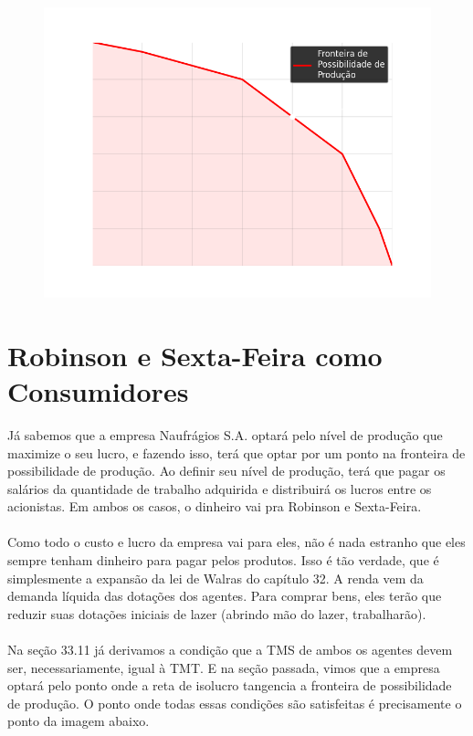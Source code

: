 \documentclass[a4paper,11pt,oneside]{book}
\theoremstyle{definition}
\theoremstyle{break}
\begin{document}
\begin{figure}[H]
	\centering
	\includegraphics[scale=0.6]{cap33_12-max_lucros.png}
\end{figure}

\section{Robinson e Sexta-Feira como Consumidores}

Já sabemos que a empresa Naufrágios S.A. optará pelo nível de produção que maximize o seu lucro, e fazendo isso, terá que optar por um ponto na fronteira de possibilidade de produção. Ao definir seu nível de produção, terá que pagar os salários da quantidade de trabalho adquirida e distribuirá os lucros entre os acionistas. Em ambos os casos, o dinheiro vai pra Robinson e Sexta-Feira.
\\~\\
Como todo o custo e lucro da empresa vai para eles, não é nada estranho que eles sempre tenham dinheiro para pagar pelos produtos. Isso é tão verdade, que é simplesmente a expansão da lei de Walras do capítulo 32. A renda vem da demanda líquida das dotações dos agentes. Para comprar bens, eles terão que reduzir suas dotações iniciais de lazer (abrindo mão do lazer, trabalharão).
\\~\\
Na seção 33.11 já derivamos a condição que a TMS de ambos os agentes devem ser, necessariamente, igual à TMT. E na seção passada, vimos que a empresa optará pelo ponto onde a reta de isolucro tangencia a fronteira de possibilidade de produção. O ponto onde todas essas condições são satisfeitas é precisamente o ponto da imagem abaixo.
\end{document}
